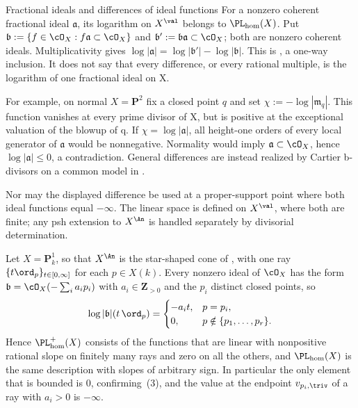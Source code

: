 \begin{warning}{Fractional ideals and differences of ideal functions}
For a nonzero coherent fractional ideal $\mathfrak a$, its logarithm on
$X^{\val}$ belongs to $\PL_{\mathrm{hom}}(X)$. Put
$\mathfrak b:=\{f\in\cO_X:f\mathfrak a\subset\cO_X\}$ and
$\mathfrak b':=\mathfrak b\mathfrak a\subset\cO_X$; both are nonzero
coherent ideals. Multiplicativity gives
$\log|\mathfrak a|=\log|\mathfrak b'|-\log|\mathfrak b|$.
This is \cite[Example~6.4]{BJ22}, a one-way inclusion. It does not say
that every difference, or every rational multiple, is the logarithm of
one fractional ideal on X.

For example, on normal $X=\mathbf P^2$ fix a closed point $q$ and set
$\chi:=-\log|\mathfrak m_q|$. This function vanishes at every prime
divisor of X, but is positive at the exceptional valuation of the blowup
of q. If $\chi=\log|\mathfrak a|$, all height-one orders of every local
generator of $\mathfrak a$ would be nonnegative. Normality would imply
$\mathfrak a\subset\cO_X$, hence $\log|\mathfrak a|\leq0$, a
contradiction. General differences are instead realized by Cartier
b-divisors on a common model in .

Nor may the displayed difference be used at a proper-support point where
both ideal functions equal $-\infty$. The linear space is defined on
$X^{\val}$, where both are finite; any psh extension to $X^{\An}$ is
handled separately by divisorial determination.
\end{warning}

\begin{example}
\label{ex:ch35-p1-hom-pl}
Let $X=\mathbf P^1_k$, so that $X^{\An}$ is the star-shaped cone of
, with one ray $\{t\ord_p\}_{t\in[0,\infty]}$ for
each $p\in X(k)$.  Every nonzero ideal of $\cO_X$ has the form
$\mathfrak b=\cO_X(-\sum_ia_ip_i)$ with $a_i\in\mathbf Z_{>0}$ and the
$p_i$ distinct closed points, so
\[
 \log|\mathfrak b|(t\,\ord_p)=
 \begin{cases}
  -a_it,&p=p_i,\\
  0,&p\notin\{p_1,\ldots,p_r\}.
 \end{cases}
\]
Hence $\PL_{\mathrm{hom}}^+(X)$ consists of the functions that are linear
with nonpositive rational slope on finitely many rays and zero on all the
others, and $\PL_{\mathrm{hom}}(X)$ is the same description with slopes of
arbitrary sign.  In particular the only element that is bounded is $0$,
confirming \,(3), and the value at the
endpoint $v_{p_i,\triv}$ of a ray with $a_i>0$ is $-\infty$.
\end{example}

